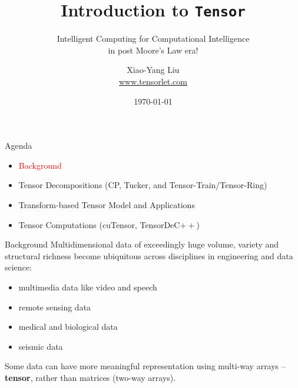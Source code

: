 \documentclass[t, 10pt, handout, aspectratio=169]{beamer}
\title[Introduction to Tensor]{Introduction to \texttt{Tensor}}
\subtitle{Intelligent Computing for Computational Intelligence \\
in post Moore’s Law era!}
\author[yanglet]{Xiao-Yang Liu\\
\url{www.tensorlet.com}}
\institute[CU]{Columbia University}
\date[\number\month/\number\day/\number\year]{\today}
\begin{document}
\begin{frame}
  \titlepage
\end{frame}

\begin{frame}{Agenda}
\begin{itemize}
    \large \item \textcolor{red}{Background}
    \large \item {Tensor Decompositions (CP, Tucker, and Tensor-Train/Tensor-Ring)}
    \large \item{Transform-based Tensor Model and Applications}
    \large \item{Tensor Computations (cuTensor, TensorDeC$++$)}
\end{itemize}
\end{frame}

\begin{frame}{Background}
\large Multidimensional data of exceedingly huge volume, variety and structural richness become ubiquitous across disciplines in engineering and data science:
\begin{itemize}
    \item multimedia data like video and speech
    \item remote sensing data
    \item medical and biological data
    \item seismic data
\end{itemize}
\margin
\large Some data can have more meaningful representation using multi-way arrays -- \textbf{tensor}, rather than matrices (two-way arrays).
\end{frame}
\end{document}
